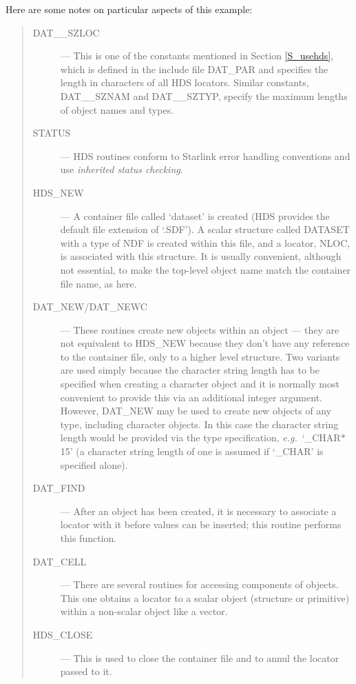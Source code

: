 Here are some notes on particular aspects of this example:

\begin{quote}
\begin{description}

\item [DAT\_\_SZLOC] ---
This is one of the constants mentioned in Section \ref{S_usehds}, which is
defined in the include file DAT\_PAR and specifies the length in characters of
all HDS locators.
Similar constants, DAT\_\_SZNAM and DAT\_\_SZTYP, specify the maximum lengths of
object names and types.

\item [STATUS] ---
HDS routines conform to Starlink error handling conventions and use
{\em inherited status checking}.

\item [HDS\_NEW] ---
A container file called `dataset' is created (HDS provides the default file
extension of `.SDF').
A scalar structure called DATASET with a type of NDF is created within this
file, and a locator, NLOC, is associated with this structure.
It is usually convenient, although not essential, to make the top-level object
name match the container file name, as here.

\item [DAT\_NEW/DAT\_NEWC] ---
These routines create new objects within an object --- they are not
equivalent to HDS\_NEW because they don't have any reference to the
container file, only to a higher level structure.
Two variants are used simply because the character string length has to be
specified when creating a character object and it is normally most convenient
to provide this via an additional integer argument.
However, DAT\_NEW may be used to create new objects of any type, including
character objects.
In this case the character string length would be provided via the type
specification, {\em e.g.}\ `\_CHAR$*$15' (a character string length of one
is assumed if `\_CHAR' is specified alone).

\item [DAT\_FIND] ---
After an object has been created, it is necessary to associate a locator with
it before values can be inserted; this routine performs this function.

\item [DAT\_CELL] ---
There are several routines for accessing components of objects.
This one obtains a locator to a scalar object (structure or primitive) within
a non-scalar object like a vector.

\item [HDS\_CLOSE] ---
This is used to close the container file and to annul the locator passed to
it.

\end{description}
\end{quote}

